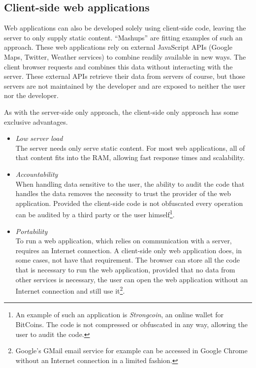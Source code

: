 \documentclass[thesis.tex]{subfiles}
\begin{document}
\subsection{Client-side web applications}
Web applications can also be developed solely using client-side code,
leaving the server to only supply static content.
``Mashups'' are fitting examples of such an approach.
These web applications rely on external JavaScript APIs
(Google Maps, Twitter, Weather services) to combine readily available in new
ways. The client browser requests and combines this data without interacting
with the server. These external APIs retrieve their data from servers of course,
but those servers are not maintained by the developer and are exposed to neither
the user nor the developer.

As with the server-side only approach, the client-side only approach has some
exclusive advantages.

\begin{itemize}
	\label{list:client-side-arguments}
	\item \emph{Low server load}\\
	The server needs only serve static content. For most web applications,
	all of that content fits into the RAM, allowing fast response times and
	scalability.
	\item \emph{Accountability}\\
	When handling data sensitive to the user, the ability to audit the code that
	handles the data removes the necessity to trust the provider of the
	web application. Provided the client-side code is not obfuscated every
	operation can be audited by a third party or the user himself\footnote{
		An example of such an application is \emph{Strongcoin}, an online wallet
		for BitCoins. The code is not compressed or obfuscated in any way, allowing
		the user to audit the code.
	}.
	\item \emph{Portability}\\
	To run a web application, which relies on communication with a server,
	requires an Internet connection. A client-side only web application does,
	in some cases, not have that requirement. The browser can store all the code
	that is necessary to run the web application, provided that no data from other
	services is necessary, the user can open the web application without an
	Internet connection and still use it\footnote{
		Google's GMail email service for example can be accessed in Google Chrome
		without an Internet connection in a limited fashion.
	}.
\end{itemize}
\end{document}
